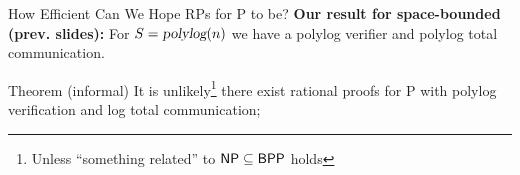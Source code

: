 \begin{frame}{How Efficient Can We Hope RPs for P to be?}
	\textbf{Our result for space-bounded (prev. slides):} For $S = {\textsl{polylog}}(n)$ we have a polylog verifier and polylog total communication.
	\pause
	\bigskip
	\begin{block}{Theorem (informal)}
It is unlikely\footnote{Unless ``something related'' to ${\mathsf{NP}} \subseteq {\ensuremath{\mathsf{BPP}}}$ holds} there exist rational proofs for P with polylog verification and log total communication;
\end{block}
\end{frame}

